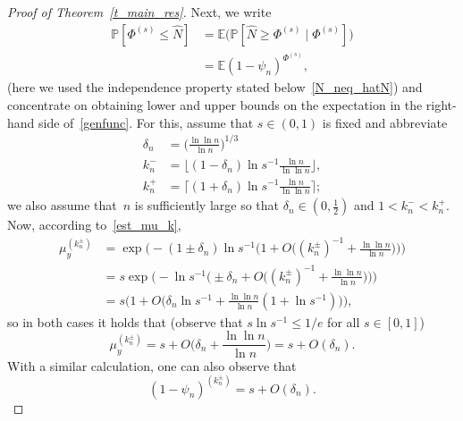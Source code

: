 \documentclass[11pt]{article}
\theoremstyle{definition}
\numberwithin{equation}{section}
\numberwithin{figure}{section}
\numberwithin{table}{section}
\newcommand{\1}[1]{{\mathbf 1}{\{#1\}}}
\newcommand{\hN}{{\widehat N}}
\newcommand{\8}{{\infty}}
\newcommand{\IP}{{\mathbb P}}
\newcommand{\IE}{{\mathbb E}}
\begin{document}
\begin{proof}[Proof of Theorem~\ref{t_main_res}]
Next, we write
\begin{align}
\IP[\Phi^{(s)}\leq \hN] &= \IE \big(\IP[\hN \geq \Phi^{(s)}\mid\Phi^{(s)}]\big)\nonumber \\
&=\IE (1-\psi_n)^{\Phi^{(s)}},\label{genfunc}
\end{align}
(here we used the independence property stated below~\eqref{N_neq_hatN}) and concentrate on obtaining lower and upper bounds on the expectation in the right-hand side of~\eqref{genfunc}. For this, assume that $s\in(0,1)$ is fixed and abbreviate
\begin{align*}
\delta_n &= \Big(\frac{\ln\ln n}{\ln n}\Big)^{1/3}\\
k_n^{-} &= \Big\lfloor(1-\delta_n)\ln s^{-1} \frac{\ln n}{\ln\ln n}
\Big\rfloor,\\
k_n^{+} &= \Big\lceil(1+\delta_n)\ln s^{-1} \frac{\ln n}{\ln\ln n}
\Big\rceil;
\end{align*}
we also assume that~$n$ is sufficiently large so that $\delta_n \in(0,\frac{1}{2})$ and $1<k_n^{-}<k_n^{+}$. Now, according to~\eqref{est_mu_k},
\begin{align*}
\mu_y^{(k_n^{\pm})} &= \exp\Big(-(1\pm \delta_n)\ln s^{-1}
\Big(1+O\Big((k_n^{\pm})^{-1}+\frac{\ln\ln n}{\ln n}\Big)\Big)\Big)\\
& = s \exp\Big(-\ln s^{-1}
\Big(\pm \delta_n+O\Big((k_n^{\pm})^{-1}+\frac{\ln\ln n}{\ln n}\Big)\Big)\Big)\\
& = s \Big(1+O\Big(\delta_n\ln s^{-1} + \frac{\ln\ln n}{\ln n}(1+\ln s^{-1})\Big)\Big),
\end{align*}
so in both cases it holds that (observe that $s\ln s^{-1}\leq 1/e$ for all $s\in[0,1]$)
\begin{equation}\label{muk_ourcase}
\mu_y^{(k_n^{\pm})} = s + O\Big(\delta_n +\frac{\ln\ln n}{\ln n} \Big) = s + O(\delta_n).
\end{equation}
With a similar calculation, one can also observe that
\begin{equation}\label{1-psi_ourcase}
(1-\psi_n)^{(k_n^{\pm})} = s + O(\delta_n).
\end{equation}


\end{proof}
\end{document}

